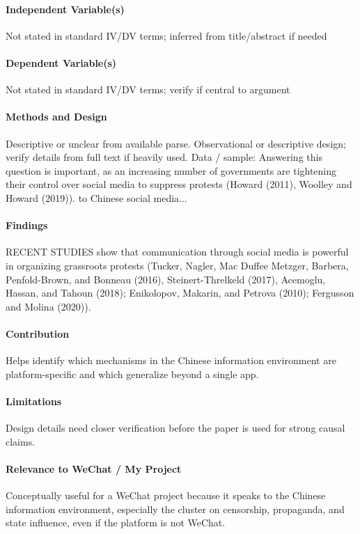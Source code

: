 \documentclass[12pt]{article}
\begin{document}
\paragraph{Independent Variable(s)} Not stated in standard IV/DV terms; inferred from title/abstract if needed

\paragraph{Dependent Variable(s)} Not stated in standard IV/DV terms; verify if central to argument

\paragraph{Methods and Design} Descriptive or unclear from available parse. Observational or descriptive design; verify details from full text if heavily used. Data / sample: Answering this question is important, as an increasing number of governments are tightening their control over social media to suppress protests (Howard (2011), Woolley and Howard (2019)). to Chinese social media...

\paragraph{Findings} RECENT STUDIES show that communication through social media is powerful in organizing grassroots protests (Tucker, Nagler, Mac Duffee Metzger, Barbera, Penfold-Brown, and Bonneau (2016), Steinert-Threlkeld (2017), Acemoglu, Hassan, and Tahoun (2018); Enikolopov, Makarin, and Petrova (2010); Fergusson and Molina (2020)).

\paragraph{Contribution} Helps identify which mechanisms in the Chinese information environment are platform-specific and which generalize beyond a single app.

\paragraph{Limitations} Design details need closer verification before the paper is used for strong causal claims.

\paragraph{Relevance to WeChat / My Project} Conceptually useful for a WeChat project because it speaks to the Chinese information environment, especially the cluster on censorship, propaganda, and state influence, even if the platform is not WeChat.
\end{document}

